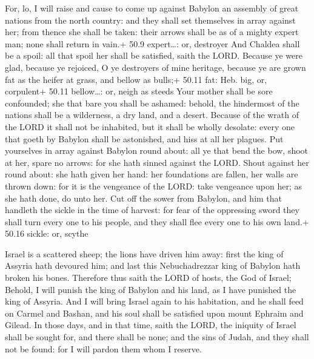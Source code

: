  For, lo, I will raise and cause to come up against
Babylon an assembly of great nations from the north country: and they
shall set themselves in array against her; from thence she shall be
taken: their arrows shall be as of a mighty expert man; none shall
return in vain.+ 50.9 expert\ldots: or, destroyer  And
Chaldea shall be a spoil: all that spoil her shall be satisfied, saith
the LORD.  Because ye were glad, because ye rejoiced, O ye
destroyers of mine heritage, because ye are grown fat as the heifer at
grass, and bellow as bulls;+ 50.11 fat: Heb. big, or, corpulent+ 50.11
bellow\ldots: or, neigh as steeds  Your mother shall be
sore confounded; she that bare you shall be ashamed: behold, the
hindermost of the nations shall be a wilderness, a dry land, and a
desert.  Because of the wrath of the LORD it shall not be
inhabited, but it shall be wholly desolate: every one that goeth by
Babylon shall be astonished, and hiss at all her plagues. 
Put yourselves in array against Babylon round about: all ye that bend
the bow, shoot at her, spare no arrows: for she hath sinned against the
LORD.  Shout against her round about: she hath given her
hand: her foundations are fallen, her walls are thrown down: for it is
the vengeance of the LORD: take vengeance upon her; as she hath done, do
unto her.  Cut off the sower from Babylon, and him that
handleth the sickle in the time of harvest: for fear of the oppressing
sword they shall turn every one to his people, and they shall flee every
one to his own land.+ 50.16 sickle: or, scythe

 Israel is a scattered sheep; the lions have driven him
away: first the king of Assyria hath devoured him; and last this
Nebuchadrezzar king of Babylon hath broken his bones. 
Therefore thus saith the LORD of hosts, the God of Israel; Behold, I
will punish the king of Babylon and his land, as I have punished the
king of Assyria.  And I will bring Israel again to his
habitation, and he shall feed on Carmel and Bashan, and his soul shall
be satisfied upon mount Ephraim and Gilead.  In those days,
and in that time, saith the LORD, the iniquity of Israel shall be sought
for, and there shall be none; and the sins of Judah, and they shall not
be found: for I will pardon them whom I reserve.

